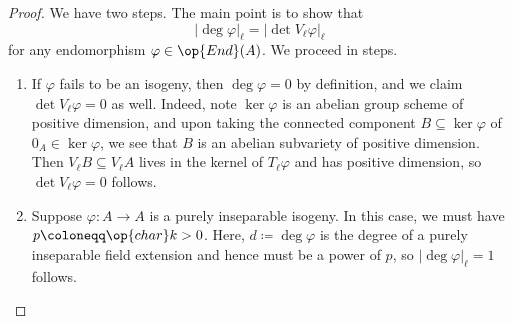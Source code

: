 \documentclass{amsart}
\begin{document}
\begin{proof}
	We have two steps. The main point is to show that
	\begin{equation}
		\left|\deg\varphi\right|_\ell=\left|\det V_\ell\varphi\right|_\ell \label{eq:desired-to-give-char-coherence}
	\end{equation}
	for any endomorphism $\varphi\in\op{End}(A)$. We proceed in steps.
	\begin{enumerate}
		\item If $\varphi$ fails to be an isogeny, then $\deg\varphi=0$ by definition, and we claim $\det V_\ell\varphi=0$ as well. Indeed, note $\ker\varphi$ is an abelian group scheme of positive dimension, and upon taking the connected component $B\subseteq\ker\varphi$ of $0_A\in\ker\varphi$, we see that $B$ is an abelian subvariety of positive dimension. Then $V_\ell B\subseteq V_\ell A$ lives in the kernel of $T_\ell\varphi$ and has positive dimension, so $\det V_\ell\varphi=0$ follows.
		\item Suppose $\varphi\colon A\to A$ is a purely inseparable isogeny. In this case, we must have $p\coloneqq\op{char}k>0$. Here, $d\coloneqq\deg\varphi$ is the degree of a purely inseparable field extension and hence must be a power of $p$, so $\left|\deg\varphi\right|_\ell=1$ follows.
		

\end{enumerate}
\end{proof}
\end{document}
